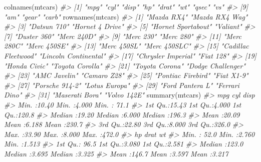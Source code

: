 \documentclass[
]{book}
\newenvironment{Shaded}{\begin{snugshade}}{\end{snugshade}}
\newcommand{\CommentTok}[1]{\textcolor[rgb]{0.56,0.35,0.01}{\textit{#1}}}
\newcommand{\FunctionTok}[1]{\textcolor[rgb]{0.00,0.00,0.00}{#1}}
\newcommand{\NormalTok}[1]{#1}
\begin{document}
\begin{Shaded}
\begin{Highlighting}[]
\FunctionTok{colnames}\NormalTok{(mtcars)}
\CommentTok{\#\textgreater{}  [1] "mpg"  "cyl"  "disp" "hp"   "drat" "wt"   "qsec" "vs"  }
\CommentTok{\#\textgreater{}  [9] "am"   "gear" "carb"}
\FunctionTok{rownames}\NormalTok{(mtcars)}
\CommentTok{\#\textgreater{}  [1] "Mazda RX4"           "Mazda RX4 Wag"      }
\CommentTok{\#\textgreater{}  [3] "Datsun 710"          "Hornet 4 Drive"     }
\CommentTok{\#\textgreater{}  [5] "Hornet Sportabout"   "Valiant"            }
\CommentTok{\#\textgreater{}  [7] "Duster 360"          "Merc 240D"          }
\CommentTok{\#\textgreater{}  [9] "Merc 230"            "Merc 280"           }
\CommentTok{\#\textgreater{} [11] "Merc 280C"           "Merc 450SE"         }
\CommentTok{\#\textgreater{} [13] "Merc 450SL"          "Merc 450SLC"        }
\CommentTok{\#\textgreater{} [15] "Cadillac Fleetwood"  "Lincoln Continental"}
\CommentTok{\#\textgreater{} [17] "Chrysler Imperial"   "Fiat 128"           }
\CommentTok{\#\textgreater{} [19] "Honda Civic"         "Toyota Corolla"     }
\CommentTok{\#\textgreater{} [21] "Toyota Corona"       "Dodge Challenger"   }
\CommentTok{\#\textgreater{} [23] "AMC Javelin"         "Camaro Z28"         }
\CommentTok{\#\textgreater{} [25] "Pontiac Firebird"    "Fiat X1{-}9"          }
\CommentTok{\#\textgreater{} [27] "Porsche 914{-}2"       "Lotus Europa"       }
\CommentTok{\#\textgreater{} [29] "Ford Pantera L"      "Ferrari Dino"       }
\CommentTok{\#\textgreater{} [31] "Maserati Bora"       "Volvo 142E"}
\FunctionTok{summary}\NormalTok{(mtcars)}
\CommentTok{\#\textgreater{}       mpg             cyl             disp      }
\CommentTok{\#\textgreater{}  Min.   :10.40   Min.   :4.000   Min.   : 71.1  }
\CommentTok{\#\textgreater{}  1st Qu.:15.43   1st Qu.:4.000   1st Qu.:120.8  }
\CommentTok{\#\textgreater{}  Median :19.20   Median :6.000   Median :196.3  }
\CommentTok{\#\textgreater{}  Mean   :20.09   Mean   :6.188   Mean   :230.7  }
\CommentTok{\#\textgreater{}  3rd Qu.:22.80   3rd Qu.:8.000   3rd Qu.:326.0  }
\CommentTok{\#\textgreater{}  Max.   :33.90   Max.   :8.000   Max.   :472.0  }
\CommentTok{\#\textgreater{}        hp             drat             wt       }
\CommentTok{\#\textgreater{}  Min.   : 52.0   Min.   :2.760   Min.   :1.513  }
\CommentTok{\#\textgreater{}  1st Qu.: 96.5   1st Qu.:3.080   1st Qu.:2.581  }
\CommentTok{\#\textgreater{}  Median :123.0   Median :3.695   Median :3.325  }
\CommentTok{\#\textgreater{}  Mean   :146.7   Mean   :3.597   Mean   :3.217  }

\end{Highlighting}
\end{Shaded}
\end{document}
